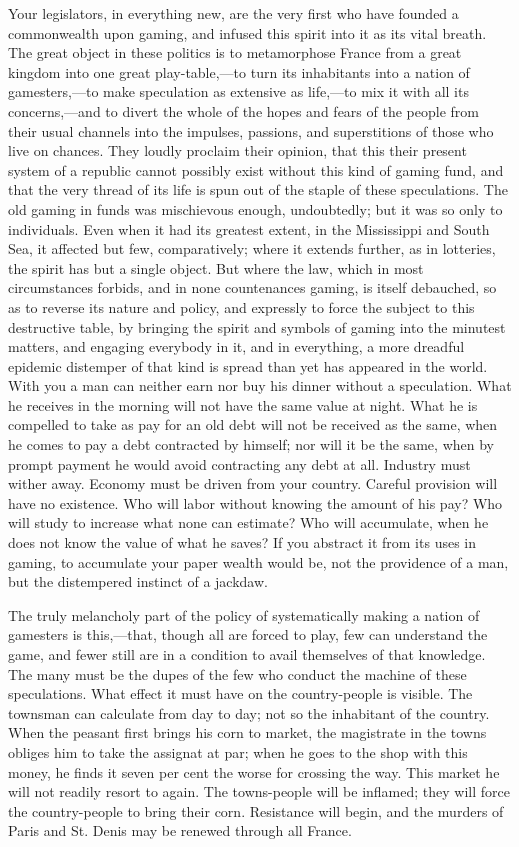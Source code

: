 Your legislators, in everything new, are the very first who have founded a commonwealth upon gaming, and infused this spirit into it as its vital breath. The great object in these politics is to metamorphose France from a great kingdom into one great play-table,—to turn its inhabitants into a nation of gamesters,—to make speculation as extensive as life,—to mix it with all its concerns,—and to divert the whole of the hopes and fears of the people from their usual channels into the impulses, passions, and superstitions of those who live on chances. They loudly proclaim their opinion, that this their present system of a republic cannot possibly exist without this kind of gaming fund, and that the very thread of its life is spun out of the staple of these speculations. The old gaming in funds was mischievous enough, undoubtedly; but it was so only to individuals. Even when it had its greatest extent, in the Mississippi and South Sea, it affected but few, comparatively; where it extends further, as in lotteries, the spirit has but a single object. But where the law, which in most circumstances forbids, and in none countenances gaming, is itself debauched, so as to reverse its nature and policy, and expressly to force the subject to this destructive table, by bringing the spirit and symbols of gaming into the minutest matters, and engaging everybody in it, and in everything, a more dreadful epidemic distemper of that kind is spread than yet has appeared in the world. With you a man can neither earn nor buy his dinner without a speculation. What he receives in the morning will not have the same value at night. What he is compelled to take as pay for an old debt will not be received as the same, when he comes to pay a debt contracted by himself; nor will it be the same, when by prompt payment he would avoid contracting any debt at all. Industry must wither away. Economy must be driven from your country. Careful provision will have no existence. Who will labor without knowing the amount of his pay? Who will study to increase what none can estimate? Who will accumulate, when he does not know the value of what he saves? If you abstract it from its uses in gaming, to accumulate your paper wealth would be, not the providence of a man, but the distempered instinct of a jackdaw.

The truly melancholy part of the policy of systematically making a nation of gamesters is this,—that, though all are forced to play, few can understand the game, and fewer still are in a condition to avail themselves of that knowledge. The many must be the dupes of the few who conduct the machine of these speculations. What effect it must have on the country-people is visible. The townsman can calculate from day to day; not so the inhabitant of the country. When the peasant first brings his corn to market, the magistrate in the towns obliges him to take the assignat at par; when he goes to the shop with this money, he finds it seven per cent the worse for crossing the way. This market he will not readily resort to again. The towns-people will be inflamed; they will force the country-people to bring their corn. Resistance will begin, and the murders of Paris and St. Denis may be renewed through all France.

